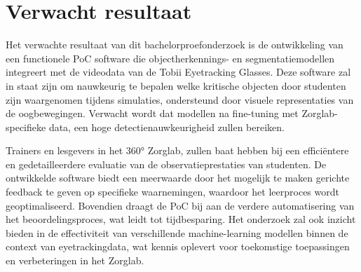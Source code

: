 \section{Verwacht resultaat}%
\label{sec:verwachte_resultaten}

Het verwachte resultaat van dit bachelorproefonderzoek is de ontwikkeling van een functionele PoC 
software die objectherkennings- en segmentatiemodellen integreert met de videodata van de Tobii Eyetracking Glasses.
Deze software zal in staat zijn om nauwkeurig te bepalen welke kritische objecten door studenten zijn waargenomen tijdens simulaties, 
ondersteund door visuele representaties van de oogbewegingen. Verwacht wordt dat modellen na fine-tuning met Zorglab-specifieke data, 
een hoge detectienauwkeurigheid zullen bereiken.
\par
Trainers en lesgevers in het 360° Zorglab, zullen baat hebben bij een efficiëntere en gedetailleerdere 
evaluatie van de observatieprestaties van studenten. De ontwikkelde software biedt een meerwaarde door het mogelijk 
te maken gerichte feedback te geven op specifieke waarnemingen, waardoor het leerproces wordt geoptimaliseerd. 
Bovendien draagt de PoC bij aan de verdere automatisering van het beoordelingsproces, wat leidt tot tijdbesparing. 
Het onderzoek zal ook inzicht bieden in de effectiviteit van verschillende 
machine-learning modellen binnen de context van eyetrackingdata, wat kennis oplevert voor toekomstige toepassingen en verbeteringen in het Zorglab.